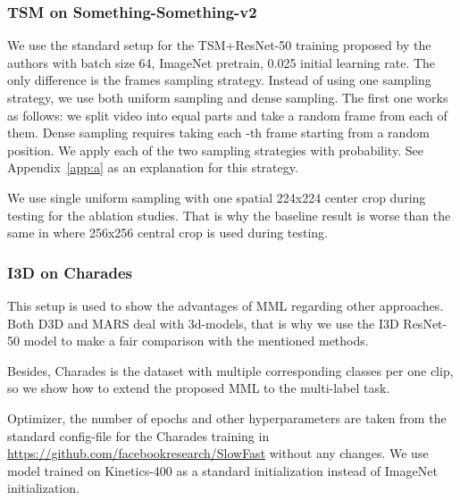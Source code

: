 \documentclass[conference]{IEEEtran}
\begin{document}
\subsubsection{TSM on Something-Something-v2}

We use the standard setup for the TSM+ResNet-50 \cite{he2016deep} training proposed by the authors with batch size 64, ImageNet pretrain, 0.025 initial learning rate. The only difference is the frames sampling strategy. Instead of using one sampling strategy, we use both uniform sampling and dense sampling. The first one works as follows: we split video into  equal parts and take a random frame from each of them. Dense sampling requires taking each -th frame starting from a random position. We apply each of the two sampling strategies with  probability. See Appendix~\ref{app:a} as an explanation for this strategy.

We use single uniform sampling with one spatial 224x224 center crop during testing for the ablation studies. That is why the baseline result is worse than the same in \cite{lin2019tsm} where 256x256 central crop is used during testing.

\subsubsection{I3D on Charades}

This setup is used to show the advantages of MML regarding other approaches. Both D3D \cite{Stroud_2020_WACV} and MARS \cite{Crasto_2019_CVPR} deal with 3d-models, that is why we use the I3D ResNet-50 model \cite{carreira2017quo} to make a fair comparison with the mentioned methods.

Besides, Charades is the dataset with multiple corresponding classes per one clip, so we show how to extend the proposed MML to the multi-label task.

Optimizer, the number of epochs and other hyperparameters are taken from the standard config-file for the Charades training in \url{https://github.com/facebookresearch/SlowFast} without any changes. We use model trained on Kinetics-400 \cite{carreira2017quo} as a standard initialization instead of ImageNet initialization.
\end{document}
